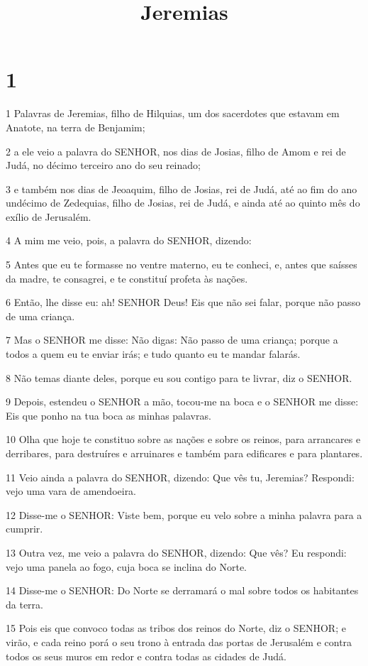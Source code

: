

\title{Jeremias}


\chapter{1}

\par 1 Palavras de Jeremias, filho de Hilquias, um dos sacerdotes que estavam em Anatote, na terra de Benjamim;
\par 2 a ele veio a palavra do SENHOR, nos dias de Josias, filho de Amom e rei de Judá, no décimo terceiro ano do seu reinado;
\par 3 e também nos dias de Jeoaquim, filho de Josias, rei de Judá, até ao fim do ano undécimo de Zedequias, filho de Josias, rei de Judá, e ainda até ao quinto mês do exílio de Jerusalém.
\par 4 A mim me veio, pois, a palavra do SENHOR, dizendo:
\par 5 Antes que eu te formasse no ventre materno, eu te conheci, e, antes que saísses da madre, te consagrei, e te constituí profeta às nações.
\par 6 Então, lhe disse eu: ah! SENHOR Deus! Eis que não sei falar, porque não passo de uma criança.
\par 7 Mas o SENHOR me disse: Não digas: Não passo de uma criança; porque a todos a quem eu te enviar irás; e tudo quanto eu te mandar falarás.
\par 8 Não temas diante deles, porque eu sou contigo para te livrar, diz o SENHOR.
\par 9 Depois, estendeu o SENHOR a mão, tocou-me na boca e o SENHOR me disse: Eis que ponho na tua boca as minhas palavras.
\par 10 Olha que hoje te constituo sobre as nações e sobre os reinos, para arrancares e derribares, para destruíres e arruinares e também para edificares e para plantares.
\par 11 Veio ainda a palavra do SENHOR, dizendo: Que vês tu, Jeremias? Respondi: vejo uma vara de amendoeira.
\par 12 Disse-me o SENHOR: Viste bem, porque eu velo sobre a minha palavra para a cumprir.
\par 13 Outra vez, me veio a palavra do SENHOR, dizendo: Que vês? Eu respondi: vejo uma panela ao fogo, cuja boca se inclina do Norte.
\par 14 Disse-me o SENHOR: Do Norte se derramará o mal sobre todos os habitantes da terra.
\par 15 Pois eis que convoco todas as tribos dos reinos do Norte, diz o SENHOR; e virão, e cada reino porá o seu trono à entrada das portas de Jerusalém e contra todos os seus muros em redor e contra todas as cidades de Judá.
